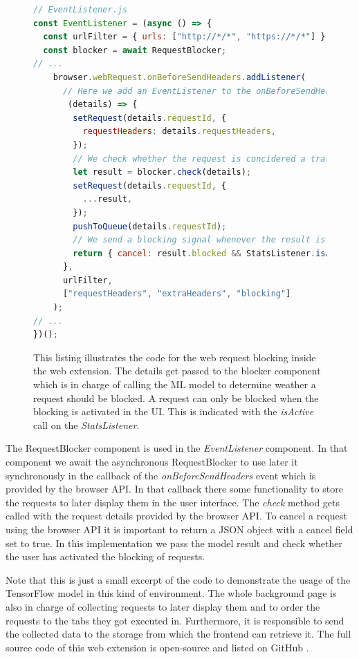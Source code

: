 \begin{figure}[ht!]
\begin{lstlisting}[language=JavaScript]
// EventListener.js
const EventListener = (async () => {
  const urlFilter = { urls: ["http://*/*", "https://*/*"] };
  const blocker = await RequestBlocker;
// ...
    browser.webRequest.onBeforeSendHeaders.addListener(
      // Here we add an EventListener to the onBeforeSendHeaders event.
       (details) => {
        setRequest(details.requestId, {
          requestHeaders: details.requestHeaders,
        });
        // We check whether the request is concidered a tracking request by passing all available information into the blocker component
        let result = blocker.check(details);
        setRequest(details.requestId, {
          ...result,
        });
        pushToQueue(details.requestId);
        // We send a blocking signal whenever the result is true and the blocking setting is active
        return { cancel: result.blocked && StatsListener.isActive() };
      },
      urlFilter,
      ["requestHeaders", "extraHeaders", "blocking"]
    );
// ...
})();
\end{lstlisting}
\caption{This listing illustrates the code for the web request blocking inside the web extension. The details get passed to the blocker component 
  which is in charge of calling the ML model to determine weather a request should be blocked. A request can only be blocked when the blocking is
  activated in the UI. This is indicated with the \emph{isActive} call on the \emph{StatsListener}.
}
\end{figure}

The RequestBlocker component is used in the \emph{EventListener} component. In that component we await the asynchronous RequestBlocker to 
use later it synchronously in the callback of the \emph{onBeforeSendHeaders} event which is provided by the browser API. In that callback there 
some functionality to store the requests to later display them in the user interface. The \emph{check} method gets called with the request details
provided by the browser API. To cancel a request using the browser API it is important to return a JSON object with a cancel field set
to true. In this implementation we pass the model result and check whether the user has activated the blocking of requests.

Note that this is just a small excerpt of the code to demonstrate the usage of the TensorFlow model in this kind of environment. The whole background page
is also in charge of collecting requests to later display them and to order the requests to the tabs they got executed in. Furthermore, it is 
responsible to send the collected data to the storage from which the frontend can retrieve it. The full source code of this web extension is open-source
and listed on GitHub \cite{trackingDetector}.

